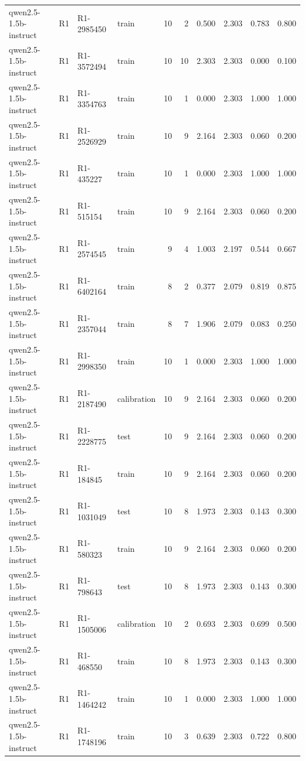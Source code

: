 \begin{table}
\begin{tabular}{llllrrrrrr}
qwen2.5-1.5b-instruct & R1 & R1-2985450 & train & 10 & 2 & 0.500 & 2.303 & 0.783 & 0.800 \\
qwen2.5-1.5b-instruct & R1 & R1-3572494 & train & 10 & 10 & 2.303 & 2.303 & 0.000 & 0.100 \\
qwen2.5-1.5b-instruct & R1 & R1-3354763 & train & 10 & 1 & 0.000 & 2.303 & 1.000 & 1.000 \\
qwen2.5-1.5b-instruct & R1 & R1-2526929 & train & 10 & 9 & 2.164 & 2.303 & 0.060 & 0.200 \\
qwen2.5-1.5b-instruct & R1 & R1-435227 & train & 10 & 1 & 0.000 & 2.303 & 1.000 & 1.000 \\
qwen2.5-1.5b-instruct & R1 & R1-515154 & train & 10 & 9 & 2.164 & 2.303 & 0.060 & 0.200 \\
qwen2.5-1.5b-instruct & R1 & R1-2574545 & train & 9 & 4 & 1.003 & 2.197 & 0.544 & 0.667 \\
qwen2.5-1.5b-instruct & R1 & R1-6402164 & train & 8 & 2 & 0.377 & 2.079 & 0.819 & 0.875 \\
qwen2.5-1.5b-instruct & R1 & R1-2357044 & train & 8 & 7 & 1.906 & 2.079 & 0.083 & 0.250 \\
qwen2.5-1.5b-instruct & R1 & R1-2998350 & train & 10 & 1 & 0.000 & 2.303 & 1.000 & 1.000 \\
qwen2.5-1.5b-instruct & R1 & R1-2187490 & calibration & 10 & 9 & 2.164 & 2.303 & 0.060 & 0.200 \\
qwen2.5-1.5b-instruct & R1 & R1-2228775 & test & 10 & 9 & 2.164 & 2.303 & 0.060 & 0.200 \\
qwen2.5-1.5b-instruct & R1 & R1-184845 & train & 10 & 9 & 2.164 & 2.303 & 0.060 & 0.200 \\
qwen2.5-1.5b-instruct & R1 & R1-1031049 & test & 10 & 8 & 1.973 & 2.303 & 0.143 & 0.300 \\
qwen2.5-1.5b-instruct & R1 & R1-580323 & train & 10 & 9 & 2.164 & 2.303 & 0.060 & 0.200 \\
qwen2.5-1.5b-instruct & R1 & R1-798643 & test & 10 & 8 & 1.973 & 2.303 & 0.143 & 0.300 \\
qwen2.5-1.5b-instruct & R1 & R1-1505006 & calibration & 10 & 2 & 0.693 & 2.303 & 0.699 & 0.500 \\
qwen2.5-1.5b-instruct & R1 & R1-468550 & train & 10 & 8 & 1.973 & 2.303 & 0.143 & 0.300 \\
qwen2.5-1.5b-instruct & R1 & R1-1464242 & train & 10 & 1 & 0.000 & 2.303 & 1.000 & 1.000 \\
qwen2.5-1.5b-instruct & R1 & R1-1748196 & train & 10 & 3 & 0.639 & 2.303 & 0.722 & 0.800 \\

\end{tabular}
\end{table}
